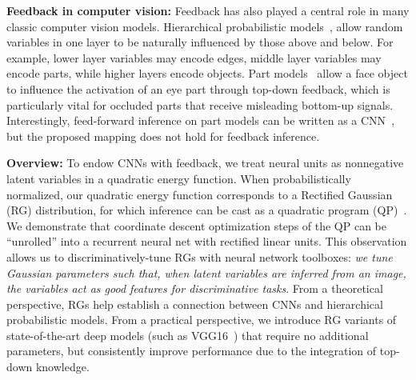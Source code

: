\documentclass[10pt,twocolumn,letterpaper]{article}
\begin{document}
{\bf Feedback in computer vision:} Feedback has also played a central
role in many classic computer vision models. Hierarchical
probabilistic models~\cite{zhu2011recursive, jin2006context,
  lee2003hierarchical}, allow random variables in one layer to be
naturally influenced by those above and below. For example, lower
layer variables may encode edges, middle layer variables may encode
parts, while higher layers encode objects. Part
models~\cite{felzenszwalb2010object} allow a face object to influence
the activation of an eye part through top-down feedback, which is
particularly vital for occluded parts that receive misleading
bottom-up signals. Interestingly, feed-forward
inference on part models can be written as a
CNN~\cite{girshick2014deformable}, but the proposed mapping does not
hold for feedback inference. 

{\bf Overview:} To endow CNNs with feedback, we treat neural units as
nonnegative latent variables in a quadratic energy function. When
probabilistically normalized, our quadratic energy function
corresponds to a Rectified Gaussian (RG) distribution, for which
inference can be cast as a quadratic program
(QP)~\cite{socci1998rectified}. We demonstrate that coordinate descent
optimization steps of the QP can be ``unrolled'' into a recurrent
neural net with rectified linear units. This observation allows us to
discriminatively-tune RGs with neural network toolboxes: {\em we tune
  Gaussian parameters such that, when latent variables are inferred
  from an image, the variables act as good features for discriminative
  tasks}. From a theoretical perspective, RGs help establish a
connection between CNNs and hierarchical probabilistic models. From a
practical perspective, we introduce RG variants of state-of-the-art
deep models (such as VGG16~\cite{simonyan2014very}) that require no
additional parameters, but consistently improve performance due to the
integration of top-down knowledge.
\end{document}
